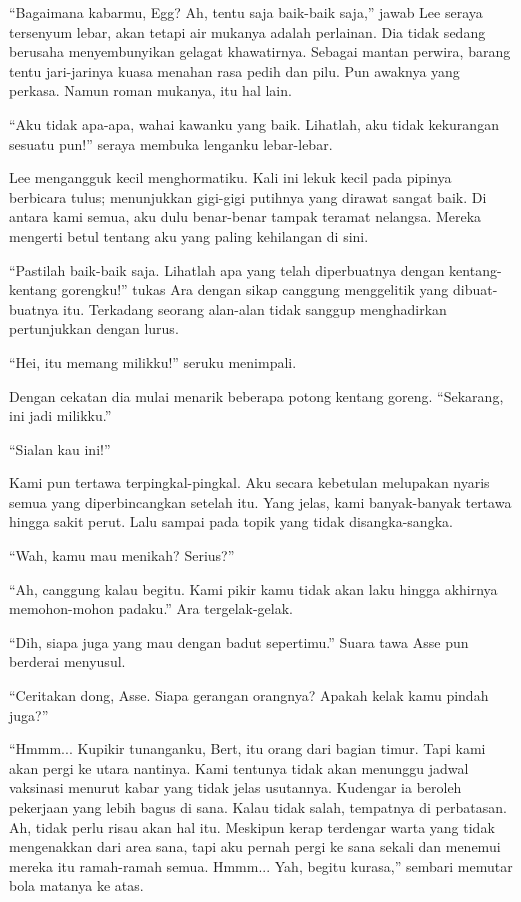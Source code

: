 \documentclass[smalldemyvopaper,11pt,twoside,onecolumn,openright,extrafontsizes]{memoir}
\begin{document}
``Bagaimana kabarmu, Egg? Ah, tentu saja baik-baik saja,'' jawab Lee seraya tersenyum lebar, akan tetapi air mukanya adalah perlainan. Dia tidak sedang berusaha menyembunyikan gelagat khawatirnya. Sebagai mantan perwira, barang tentu jari-jarinya kuasa menahan rasa pedih dan pilu. Pun awaknya yang perkasa. Namun roman mukanya, itu hal lain.

``Aku tidak apa-apa, wahai kawanku yang baik. Lihatlah, aku tidak kekurangan sesuatu pun!'' seraya membuka lenganku lebar-lebar.

Lee mengangguk kecil menghormatiku. Kali ini lekuk kecil pada pipinya berbicara tulus; menunjukkan gigi-gigi putihnya yang dirawat sangat baik. Di antara kami semua, aku dulu benar-benar tampak teramat nelangsa. Mereka mengerti betul tentang aku yang paling kehilangan di sini.

``Pastilah baik-baik saja. Lihatlah apa yang telah diperbuatnya dengan kentang-kentang gorengku!'' tukas Ara dengan sikap canggung menggelitik yang dibuat-buatnya itu. Terkadang seorang alan-alan tidak sanggup menghadirkan pertunjukkan dengan lurus.

``Hei, itu memang milikku!'' seruku menimpali.

Dengan cekatan dia mulai menarik beberapa potong kentang goreng. ``Sekarang, ini jadi milikku.''

``Sialan kau ini!''

Kami pun tertawa terpingkal-pingkal. Aku secara kebetulan melupakan nyaris semua yang diperbincangkan setelah itu. Yang jelas, kami banyak-banyak tertawa hingga sakit perut. Lalu sampai pada topik yang tidak disangka-sangka.

``Wah, kamu mau menikah? Serius?''

``Ah, canggung kalau begitu. Kami pikir kamu tidak akan laku hingga akhirnya memohon-mohon padaku.'' Ara tergelak-gelak.

``Dih, siapa juga yang mau dengan badut sepertimu.'' Suara tawa Asse pun berderai menyusul.

``Ceritakan dong, Asse. Siapa gerangan orangnya? Apakah kelak kamu pindah juga?''

``Hmmm... Kupikir tunanganku, Bert, itu orang dari bagian timur. Tapi kami akan pergi ke utara nantinya. Kami tentunya tidak akan menunggu jadwal vaksinasi menurut kabar yang tidak jelas usutannya. Kudengar ia beroleh pekerjaan yang lebih bagus di sana. Kalau tidak salah, tempatnya di perbatasan. Ah, tidak perlu risau akan hal itu. Meskipun kerap terdengar warta yang tidak mengenakkan dari area sana, tapi aku pernah pergi ke sana sekali dan menemui mereka itu ramah-ramah semua. Hmmm... Yah, begitu kurasa,'' sembari memutar bola matanya ke atas.
\end{document}

